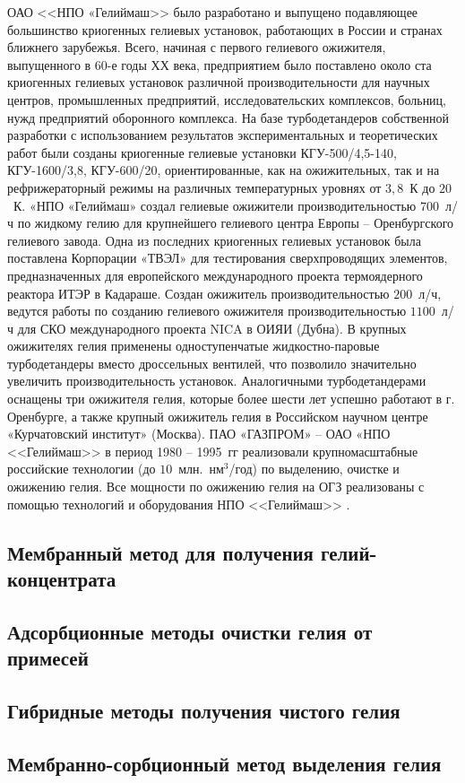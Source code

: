 ОАО <<НПО «Гелиймаш>> было разработано и выпущено подавляющее большинство криогенных гелиевых установок, работающих в России и странах ближнего зарубежья. Всего, начиная с первого гелиевого ожижителя, выпущенного в 60-е годы ХХ века, предприятием было поставлено около ста криогенных гелиевых установок различной производительности для научных центров, промышленных предприятий, исследовательских комплексов, больниц, нужд предприятий оборонного комплекса. На базе турбодетандеров собственной разработки с использованием результатов экспериментальных и теоретических работ были созданы криогенные гелиевые установки КГУ-500/4,5-140, КГУ-1600/3,8, КГУ-600/20, ориентированные, как на ожижительных, так и на рефрижераторный режимы на различных температурных уровнях от $3,8$~К до $20$~К. «НПО «Гелиймаш» создал гелиевые ожижители производительностью $700$~л/ч по жидкому гелию для крупнейшего гелиевого центра Европы -- Оренбургского гелиевого завода. Одна из последних криогенных гелиевых установок была поставлена  Корпорации «ТВЭЛ» для тестирования сверхпроводящих элементов, предназначенных для европейского международного проекта термоядерного реактора ИТЭР в Кадараше. Создан ожижитель производительностью $200$~л/ч, ведутся работы по созданию гелиевого ожижителя производительностью $1100$~л/ч для СКО международного проекта NICA в ОИЯИ (Дубна). В крупных ожижителях гелия применены одноступенчатые жидкостно-паровые турбодетандеры вместо дроссельных вентилей, что позволило значительно увеличить производительность установок. Аналогичными турбодетандерами оснащены три ожижителя гелия, которые более шести лет успешно работают в г. Оренбурге, а также крупный ожижитель гелия в Российском научном центре «Курчатовский институт» (Москва). ПАО «ГАЗПРОМ» -- ОАО «НПО <<Гелиймаш>> в период 1980 -- 1995~гг реализовали крупномасштабные российские технологии (до $10$~млн.~нм$^3$/год) по выделению, очистке и ожижению гелия. Все мощности по ожижению гелия на ОГЗ реализованы с помощью технологий и оборудования НПО <<Гелиймаш>> \cite{GeliyMash_OG-1000}.


\cite{Stepanov_Avtoreferat}

\subsection{Мембранный метод для получения гелий-концентрата} \label{section_1_1_1}

\subsection{Адсорбционные методы очистки гелия от примесей} \label{section_1_1_2}

\subsection{Гибридные методы получения чистого гелия} \label{section_1_1_3}

\subsection{Мембранно-сорбционный метод выделения гелия} \label{section_1_1_4}
